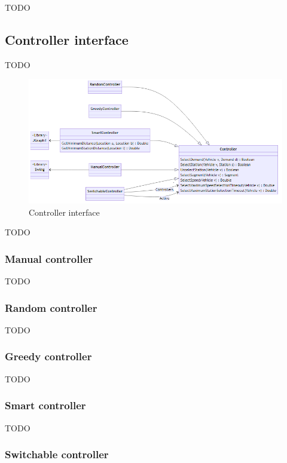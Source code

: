 \documentclass[10pt,twocolumn]{article}
\begin{document}
TODO

\subsection{Controller interface}
\label{sec:controller-interface}

TODO

\begin{figure}[tbp]
    \includegraphics[width=\textwidth]{../../diagrams/controller/classes.png}
    \caption{Controller interface}
    \label{fig:controller-interface}
\end{figure}

TODO

\subsubsection{Manual controller}

TODO

\subsubsection{Random controller}

TODO

\subsubsection{Greedy controller}

TODO

\subsubsection{Smart controller}

TODO

\subsubsection{Switchable controller}
\end{document}
